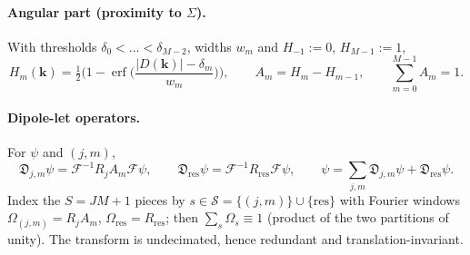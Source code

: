 \documentclass[11pt]{article}
\newcommand{\F}{\mathcal{F}}
\newcommand{\bk}{\bm{k}}
\newcommand{\md}{\mathfrak{D}}
\newcommand{\abs}[1]{\lvert #1\rvert}
\theoremstyle{remark}
\begin{document}
\paragraph{Angular part (proximity to $\Sigma$).} With thresholds $\delta_0<\dots<\delta_{M-2}$, widths $w_m$ and $H_{-1}:=0$, $H_{M-1}:=1$,
\begin{equation}\label{eq:angular}
H_m(\bk)=\tfrac12\Big(1-\operatorname{erf}\Big(\frac{\abs{D(\bk)}-\delta_m}{w_m}\Big)\Big),\qquad A_m=H_m-H_{m-1},\qquad \sum_{m=0}^{M-1}A_m=1 .
\end{equation}

\paragraph{Dipole-let operators.} For $\psi$ and $(j,m)$,
\begin{equation}\label{eq:dipolelet}
\md_{j,m}\psi=\F^{-1}R_jA_m\F\psi,\qquad \md_{\mathrm{res}}\psi=\F^{-1}R_{\mathrm{res}}\F\psi,\qquad
\psi=\sum_{j,m}\md_{j,m}\psi+\md_{\mathrm{res}}\psi .
\end{equation}
Index the $S=JM+1$ pieces by $s\in\mathcal S=\{(j,m)\}\cup\{\mathrm{res}\}$ with Fourier windows $\Omega_{(j,m)}=R_jA_m$, $\Omega_{\mathrm{res}}=R_{\mathrm{res}}$; then $\sum_{s}\Omega_s\equiv1$
(product of the two partitions of unity). The transform is undecimated, hence redundant and translation-invariant.
\end{document}

